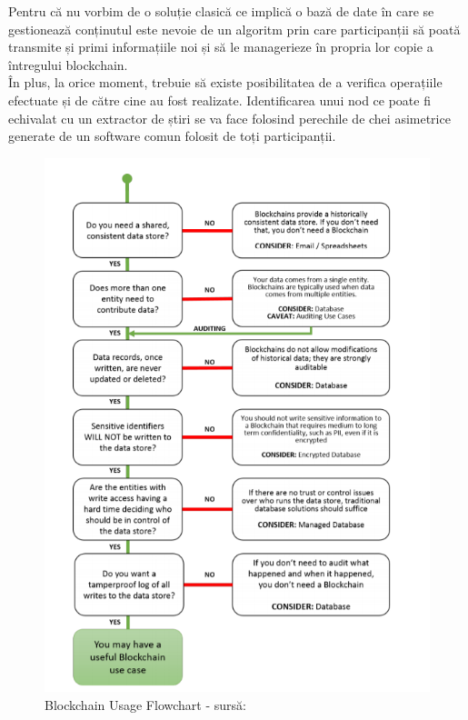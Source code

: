 Pentru că nu vorbim de o soluție clasică ce implică o bază de date în care se gestionează conținutul este nevoie de un algoritm prin care participanții să poată transmite și primi informațiile noi și să le managerieze în propria lor copie a întregului blockchain.\\

În plus, la orice moment, trebuie să existe posibilitatea de a verifica operațiile efectuate și de către cine au fost realizate. Identificarea unui nod ce poate fi echivalat cu un extractor de știri se va face folosind perechile de chei asimetrice generate de un software comun folosit de toți participanții.\\

\begin{figure}[H] 
\centering
\includegraphics[scale=0.9]{Images/BC_Motivation.png}
\caption{Blockchain Usage Flowchart - sursă: \cite{Blockchain_Overview_NIST}}
\end{figure}

\clearpage